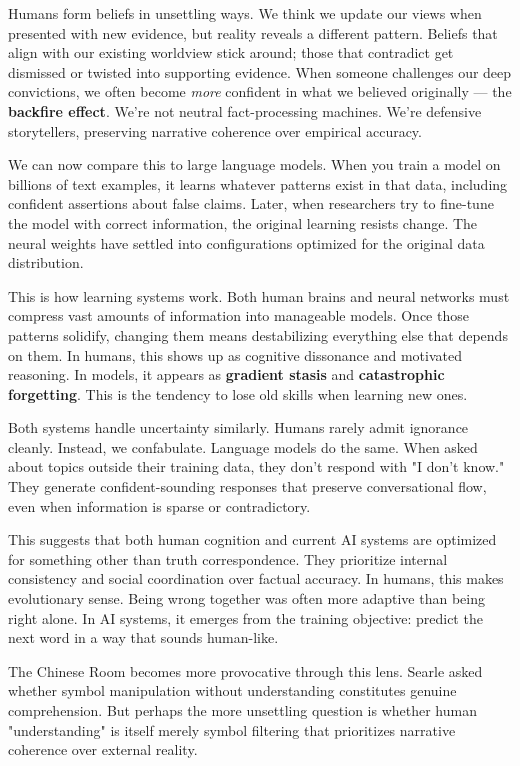 \begin{commentary}
Humans form beliefs in unsettling ways. We think we update our views when presented with new evidence, but reality reveals a different pattern. Beliefs that align with our existing worldview stick around; those that contradict get dismissed or twisted into supporting evidence. When someone challenges our deep convictions, we often become \textit{more} confident in what we believed originally — the \textbf{backfire effect}. We're not neutral fact-processing machines. We're defensive storytellers, preserving narrative coherence over empirical accuracy.

We can now compare this to large language models. When you train a model on billions of text examples, it learns whatever patterns exist in that data, including confident assertions about false claims. Later, when researchers try to fine-tune the model with correct information, the original learning resists change. The neural weights have settled into configurations optimized for the original data distribution.

This is how learning systems work. Both human brains and neural networks must compress vast amounts of information into manageable models. Once those patterns solidify, changing them means destabilizing everything else that depends on them. In humans, this shows up as cognitive dissonance and motivated reasoning. In models, it appears as \textbf{gradient stasis} and \textbf{catastrophic forgetting}. This is the tendency to lose old skills when learning new ones.

Both systems handle uncertainty similarly. Humans rarely admit ignorance cleanly. Instead, we confabulate. Language models do the same. When asked about topics outside their training data, they don't respond with "I don't know." They generate confident-sounding responses that preserve conversational flow, even when information is sparse or contradictory.

This suggests that both human cognition and current AI systems are optimized for something other than truth correspondence. They prioritize internal consistency and social coordination over factual accuracy. In humans, this makes evolutionary sense. Being wrong together was often more adaptive than being right alone. In AI systems, it emerges from the training objective: predict the next word in a way that sounds human-like.

The Chinese Room becomes more provocative through this lens. Searle asked whether symbol manipulation without understanding constitutes genuine comprehension. But perhaps the more unsettling question is whether human "understanding" is itself merely symbol filtering that prioritizes narrative coherence over external reality.
\end{commentary}